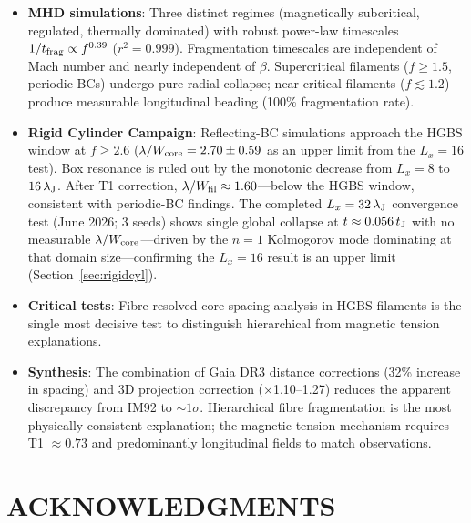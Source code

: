 \documentclass[twoside,twocolumn]{mnras}
\begin{document}
\begin{itemize}
    \item \textbf{MHD simulations}: Three distinct regimes (magnetically subcritical,
    regulated, thermally dominated) with robust power-law timescales
    $1/t_{\rm frag} \propto f^{0.39}$ ($r^2 = 0.999$). Fragmentation timescales are
    independent of Mach number and nearly independent of $\beta$. Supercritical filaments
    ($f \geq 1.5$, periodic BCs) undergo pure radial collapse; near-critical filaments
    ($f \lesssim 1.2$) produce measurable longitudinal beading (100\% fragmentation rate).

    \item \textbf{Rigid Cylinder Campaign}: Reflecting-BC simulations approach the HGBS window at $f \geq 2.6$ ($\lambda/W_{\rm core} = 2.70 \pm 0.59$ as an upper limit from the $L_x=16$ test). Box resonance is
    ruled out by the monotonic decrease from $L_x = 8$ to $16\,\lambda_{\rm J}$.
    After T1 correction, $\lambda/W_{\rm fil} \approx 1.60$---below the HGBS window,
    consistent with periodic-BC findings. The completed $L_x = 32\,\lambda_{\rm J}$
    convergence test (June 2026; 3 seeds) shows single global collapse at
    $t \approx 0.056\,t_{\rm J}$ with no measurable $\lambda/W_{\rm core}$---driven by
    the $n=1$ Kolmogorov mode dominating at that domain size---confirming the $L_x = 16$
    result is an upper limit (Section~\ref{sec:rigidcyl}).

    \item \textbf{Critical tests}: Fibre-resolved core spacing analysis in HGBS
    filaments is the single most decisive test to distinguish hierarchical from magnetic
    tension explanations.

    \item \textbf{Synthesis}: The combination of Gaia DR3 distance corrections (32\% increase in spacing) and 3D projection correction ($\times$1.10--1.27) reduces the apparent discrepancy from IM92 to ${\sim}1\sigma$. Hierarchical fibre fragmentation is the most physically consistent explanation; the magnetic tension mechanism requires T1 $\approx 0.73$ and predominantly longitudinal fields to match observations.

\end{itemize}

\section*{ACKNOWLEDGMENTS}
\end{document}
